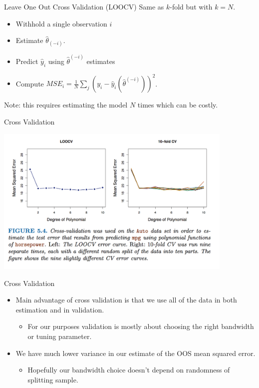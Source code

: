 \documentclass[11pt,handout,xcolor=pdftex,dvipsnames,table,mathserif,aspectratio=169]{beamer}
\begin{document}
\begin{frame}{Leave One Out Cross Validation (LOOCV)}
Same as $k$-fold but with $k=N$.
\begin{itemize}
\item Withhold a single observation $i$
\item Estimate $\hat{\theta}_{(-i)}$.
\item Predict $\hat{y}_i$ using $\hat{\theta}^{(-i)}$ estimates
\item Compute $MSE_i =\frac{1}{N} \sum_j (y_i -\hat{y}_i(\hat{\theta}^{(-i)}))^2$.
\end{itemize}
\vspace{0.2cm}
Note: this requires estimating the model $N$ times which can be costly.
\end{frame}



\begin{frame}{Cross Validation}
\begin{center}
\includegraphics[width=4.5in]{./resources/comparison-cv}
\end{center}
\end{frame}

\begin{frame}{Cross Validation}
\begin{itemize}
\item Main advantage of cross validation is that we use all of the data in both \alert{estimation} and in \alert{validation}.
\begin{itemize}
\item For our purposes validation is mostly about choosing the right bandwidth or tuning parameter.
\end{itemize}
\item We have much lower variance in our estimate of the OOS mean squared error.
\begin{itemize}
\item Hopefully our bandwidth choice doesn't depend on randomness of splitting sample.
\end{itemize}
\end{itemize}
\end{frame}
\end{document}
